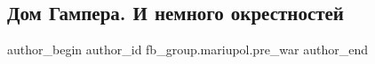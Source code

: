  
 
 
 
 

\subsection{Дом Гампера. И немного окрестностей}
\label{sec:12_02_2023.fb.fb_group.mariupol.pre_war.5.dom_gampera__i_nemno}

\ifcmt
 author_begin
   author_id fb_group.mariupol.pre_war
 author_end
\fi
